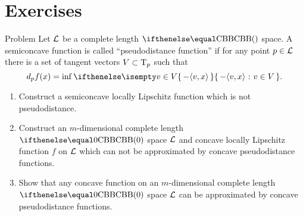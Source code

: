 \section{Exercises}

\begin{thm}{Problem}
Let $\mathcal{L}$ be a complete length $\Alex{}$ space.
A semiconcave function is called ``pseudodistance function''
if for any point $p\in\spc{L}$ 
there is a set of tangent vectors $V\subset \T_p$
such that 
\[d_p f(x)=\inf\set{-\<v,x\>}{v\in V}.\]
\begin{enumerate}
\item Construct a semiconcave locally Lipschitz function which is not pseudodistance.
\item Construct  an $m$-dimensional complete length $\Alex0$ space $\mathcal{L}$ and concave locally Lipschitz function $f$ on $\mathcal{L}$ which can not be approximated by concave pseudodistance functions.
\item Show that any concave function on  an $m$-dimensional complete length $\Alex0$ space $\mathcal{L}$ can be approximated by concave pseudodistance functions.
\end{enumerate}

\end{thm}
